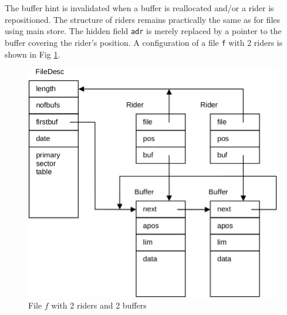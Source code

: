 \begin{enumerate}
    The buffer hint is invalidated when a buffer is reallocated and/or a rider is repositioned.  The
    structure of riders remains practically the same as for files using main store. The hidden field
    \verb|adr| is merely replaced by a pointer to the buffer covering the rider's position. A
    configuration of a file \verb|f| with 2 riders is shown in Fig \ref{fig:file}.
    \begin{figure}
      \flushright
      \label{fig:file}
      \includegraphics[width=.9\textwidth]{i/m}
      \caption{File $f$ with 2 riders and 2 buffers}
    \end{figure}
\end{enumerate}

